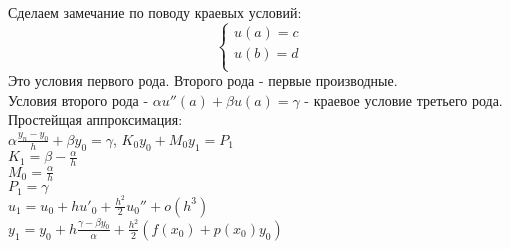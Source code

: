 Сделаем замечание по поводу краевых условий:\\
\begin{equation}
\begin{cases}
u(a) = c\\
u(b) = d\\
\end{cases}
\end{equation}
Это условия первого рода. Второго рода - первые производные.\\
Условия второго рода - $\alpha u''(a) + \beta u(a) = \gamma$ - краевое условие третьего рода.\\

Простейщая аппроксимация:\\
$\alpha\frac{y_{n} - y_{0}}{h} + \beta y_{0} = \gamma$, $K_{0} y_{0} + M_{0} y_{1} = P_{1}$\\
$K_{1} = \beta - \frac{\alpha}{h}$\\
$M_{0} = \frac{\alpha}{h}$\\
$P_{1} = \gamma$\\

$u_{1} = u_{0} + h u'_{0} + \frac{h^{2}}{2}u_{0}'' +  o(h^{3})$\\
$y_{1} = y_{0} + h \frac{\gamma - \beta y_{0}}{\alpha} + \frac{h^{2}}{2} (f(x_{0}) + p(x_{0}) y_{0})$\\
